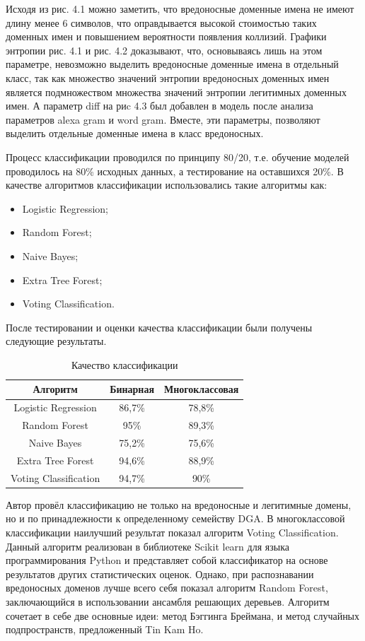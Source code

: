     Исходя из рис. 4.1 можно заметить, что вредоносные доменные имена не имеют длину менее 6 символов, что оправдывается высокой стоимостью таких доменных имен и повышением вероятности появления коллизий. Графики энтропии рис. 4.1 и рис. 4.2 доказывают, что, основываясь лишь на этом параметре, невозможно выделить вредоносные доменные имена в отдельный класс, так как множество значений энтропии вредоносных доменных имен является подмножеством множества значений энтропии легитимных доменных имен. А параметр diff на риc 4.3 был добавлен в модель после анализа параметров alexa gram и word gram. Вместе, эти параметры, позволяют выделить отдельные доменные имена в класс вредоносных.

    Процесс классификации проводился по принципу 80/20, т.е. обучение моделей проводилось на 80\% исходных данных, а тестирование на оставшихся 20\%. В качестве алгоритмов классификации использовались такие алгоритмы как:
    \begin{itemize}
    \item Logistic Regression;
    \item Random Forest;
    \item Naive Bayes;
    \item Extra Tree Forest;
    \item Voting Classification.
    \end{itemize}

    После тестировании и оценки качества классификации были получены следующие результаты.
    \begin{table}[ht]
    \centering
    \caption{Качество классификации}\label{}
    \begin{tabular}{@{}ccc@{}}
    \toprule
    Алгоритм              & Бинарная & Многоклассовая \\ \midrule
    Logistic Regression   & 86,7\%   & 78,8\%         \\
    Random Forest         & 95\%     & 89,3\%         \\
    Naive Bayes           & 75,2\%   & 75,6\%         \\
    Extra Tree Forest     & 94,6\%   & 88,9\%         \\
    Voting Classification & 94,7\%   & 90\%           \\ \bottomrule
    \end{tabular}
    \end{table}

    Автор провёл классификацию не только на вредоносные и легитимные домены, но и по принадлежности к определенному семейству DGA. В многоклассовой классификации наилучший результат показал алгоритм Voting Classification. Данный алгоритм реализован в библиотеке Scikit learn для языка программирования Python и представляет собой классификатор на основе результатов других статистических оценок. Однако, при распознавании вредоносных доменов лучше всего себя показал алгоритм Random Forest, заключающийся в использовании ансамбля решающих деревьев. Алгоритм сочетает в себе две основные идеи: метод Бэггинга Бреймана, и метод случайных подпространств, предложенный Tin Kam Ho.


